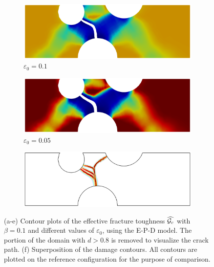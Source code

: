 \begin{figure}[!htb]
  \begin{subfigure}[b]{0.3\textwidth}
    \centering
    \includegraphics[width=\textwidth,scale=0.5]{Chapter5/figures/3pb/beta_0.1_e0_0.1}
    \caption{$\varepsilon_0=0.1$}
  \end{subfigure}
  \begin{subfigure}[b]{0.3\textwidth}
    \centering
    \includegraphics[width=\textwidth,scale=0.5]{Chapter5/figures/3pb/beta_0.1_e0_0.05}
    \caption{$\varepsilon_0=0.05$}
  \end{subfigure}
  \begin{subfigure}[b]{0.3\textwidth}
    \centering
    \includegraphics[width=\textwidth,scale=0.5]{Chapter5/figures/3pb/compare_beta_constant}
    \caption{}
  \end{subfigure}
  \caption[Comparison of crack paths for different values of $\epsilon_0$.]{(a-e) Contour plots of the effective fracture toughness $\widehat{{\mathcal{G}_c}}$ with $\beta=0.1$ and different values of $\varepsilon_0$, using the E-P-D model. The portion of the domain with $d > 0.8$ is removed to visualize the crack path. (f) Superposition of the damage contours. All contours are plotted on the reference configuration for the purpose of comparison.}
  \label{fig: Chapter5/3pb/2D_comparison_constant_beta}
\end{figure}

